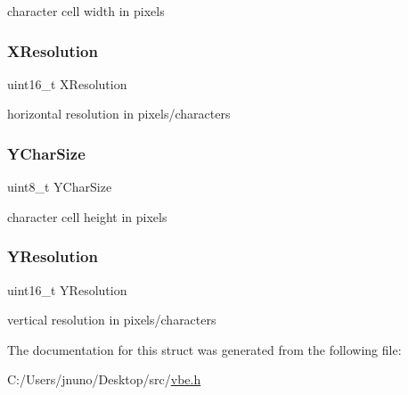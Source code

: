 character cell width in pixels 

\hypertarget{struct____attribute_____a16f6408e5a85c7a7785a0cee64b6a219}{}\label{struct____attribute_____a16f6408e5a85c7a7785a0cee64b6a219} 
\subsubsection{\texorpdfstring{X\+Resolution}{XResolution}}
{\footnotesize\ttfamily uint16\+\_\+t X\+Resolution}



horizontal resolution in pixels/characters 

\hypertarget{struct____attribute_____a330f00ebd49dccd2325d43cdbd646f09}{}\label{struct____attribute_____a330f00ebd49dccd2325d43cdbd646f09} 
\subsubsection{\texorpdfstring{Y\+Char\+Size}{YCharSize}}
{\footnotesize\ttfamily uint8\+\_\+t Y\+Char\+Size}



character cell height in pixels 

\hypertarget{struct____attribute_____afa8aba2156994750d500f85d0f8425cb}{}\label{struct____attribute_____afa8aba2156994750d500f85d0f8425cb} 
\subsubsection{\texorpdfstring{Y\+Resolution}{YResolution}}
{\footnotesize\ttfamily uint16\+\_\+t Y\+Resolution}



vertical resolution in pixels/characters 



The documentation for this struct was generated from the following file\+:\begin{DoxyCompactItemize}
\item 
C\+:/\+Users/jnuno/\+Desktop/src/\hyperlink{vbe_8h}{vbe.\+h}\end{DoxyCompactItemize}

